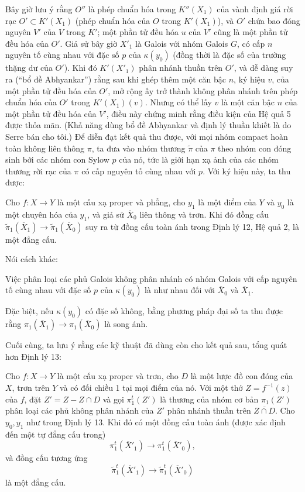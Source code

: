 Bây giờ lưu ý rằng $O''$ là phép chuẩn hóa trong $K''(X_1)$ của vành định giá
rời rạc $O'\subset K'(X_1)$ (phép chuẩn hóa của $O$ trong $K'(X_1)$), và
$O'$ chứa bao đóng nguyên $V'$ của $V$ trong $K'$; một phần tử đều hóa $u$ của
$V'$ cũng là một phần tử đều hóa của $O'$. Giả sử bây giờ $X'_1$ là Galois với
nhóm Galois $G$, có cấp $n$ nguyên tố cùng nhau với đặc số $p$ của
$\kappa(y_0)$ (đồng thời là đặc số của trường thặng dư của $O'$). Khi đó
$K'(X'_1)$ phân nhánh thuần trên $O'$, và dễ dàng suy ra (“bổ đề Abhyankar”)
rằng sau khi ghép thêm một căn bậc $n$, ký hiệu $v$, của một phần tử đều hóa
của $O'$, mở rộng ấy trở thành không phân nhánh trên phép chuẩn hóa của $O'$
trong $K'(X_1)(v)$. Nhưng có thể lấy $v$ là một căn bậc $n$ của một phần tử
đều hóa của $V'$, điều này chứng minh rằng điều kiện của Hệ quả 5 được thỏa
mãn. (Khả năng dùng bổ đề Abhyankar và định lý thuần khiết là do Serre bán cho
tôi.) Để diễn đạt kết quả thu được, với mọi nhóm compact hoàn toàn không liên
thông $\pi$, ta đưa vào nhóm thương $\widetilde\pi$ của $\pi$ theo nhóm con
đóng sinh bởi các nhóm con Sylow $p$ của nó, tức là giới hạn xạ ảnh của các
nhóm thương rời rạc của $\pi$ có cấp nguyên tố cùng nhau với $p$. Với ký hiệu
này, ta thu được:

 Cho $f:X\longrightarrow Y$ là một cấu xạ proper và
phẳng, cho $y_1$ là một điểm của $Y$ và $y_0$ là một chuyên hóa của $y_1$, và
giả sử $\overline X_0$ liên thông và trơn. Khi đó đồng cấu
$\widetilde\pi_1(\overline X_1)\longrightarrow
\widetilde\pi_1(\overline X_0)$ suy ra từ đồng cấu toàn ánh trong Định lý 12,
Hệ quả 2, là một đẳng cấu.

Nói cách khác:

 Việc phân loại các phủ Galois không phân nhánh có nhóm
Galois với cấp nguyên tố cùng nhau với đặc số $p$ của $\kappa(y_0)$ là như
nhau đối với $\overline X_0$ và $\overline X_1$.

Đặc biệt, nếu $\kappa(y_0)$ có đặc số không, bằng phương pháp đại số ta thu
được rằng $\pi_1(\overline X_1)\longrightarrow\pi_1(\overline X_0)$ là song
ánh.

Cuối cùng, ta lưu ý rằng các kỹ thuật đã dùng còn cho kết quả sau, tổng quát
hơn Định lý 13:

 Cho $f:X\longrightarrow Y$ là một cấu xạ proper và trơn,
cho $D$ là một lược đồ con đóng của $X$, trơn trên $Y$ và có đối chiều 1 tại
mọi điểm của nó. Với một thớ $Z=f^{-1}(z)$ của $f$, đặt $Z'=Z-Z\cap D$ và gọi
$\pi_1^t(Z')$ là thương của nhóm cơ bản $\pi_1(Z')$ phân loại các phủ không
phân nhánh của $Z'$ phân nhánh thuần trên $\overline{Z\cap D}$. Cho $y_0,y_1$
như trong Định lý 13. Khi đó có một đồng cấu toàn ánh (được xác định đến một tự
đẳng cấu trong)
\[
  \pi_1^t(\overline X'_1)\longrightarrow\pi_1^t(\overline X'_0),
\]
và đồng cấu tương ứng
\[
  \widetilde\pi_1^t(\overline X'_1)
  \longrightarrow\widetilde\pi_1^t(\overline X'_0)
\]
là một đẳng cấu.

